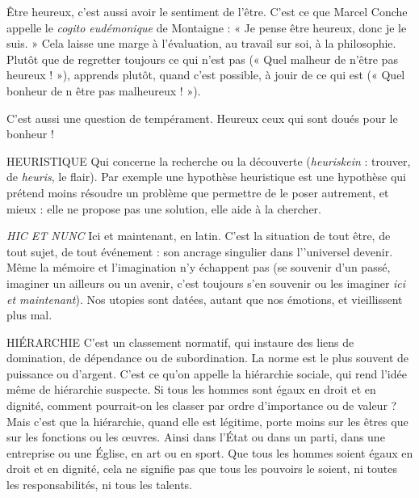Être heureux, c’est aussi avoir le sentiment de l’être. C’est ce que Marcel
Conche appelle le {\it cogito eudémonique} de Montaigne : « Je pense être heureux,
donc je le suis. » Cela laisse une marge à l’évaluation, au travail sur soi, à la philosophie.
Plutôt que de regretter toujours ce qui n’est pas (« Quel malheur de
n'être pas heureux ! »), apprends plutôt, quand c’est possible, à jouir de ce qui
est (« Quel bonheur de n être pas malheureux ! »).

C’est aussi une question de tempérament. Heureux ceux qui sont doués
pour le bonheur !

HEURISTIQUE Qui concerne la recherche ou la découverte ({\it heuriskein} :
trouver, de {\it heuris}, le flair). Par exemple une hypothèse
heuristique est une hypothèse qui prétend moins résoudre un problème que
permettre de le poser autrement, et mieux : elle ne propose pas une solution,
elle aide à la chercher.

{\it HIC ET NUNC} Ici et maintenant, en latin. C’est la situation de tout être, de
tout sujet, de tout événement : son ancrage singulier dans
l’'universel devenir. Même la mémoire et l'imagination n’y échappent pas (se
souvenir d’un passé, imaginer un ailleurs ou un avenir, c’est toujours s’en souvenir
ou les imaginer {\it ici et maintenant}). Nos utopies sont datées, autant que
nos émotions, et vieillissent plus mal.

HIÉRARCHIE C’est un classement normatif, qui instaure des liens de
domination, de dépendance ou de subordination. La norme
est le plus souvent de puissance ou d’argent. C’est ce qu’on appelle la hiérarchie
sociale, qui rend l’idée même de hiérarchie suspecte. Si tous les hommes sont
égaux en droit et en dignité, comment pourrait-on les classer par ordre
d'importance ou de valeur ? Mais c’est que la hiérarchie, quand elle est légitime,
porte moins sur les êtres que sur les fonctions ou les œuvres. Ainsi dans
l'État ou dans un parti, dans une entreprise ou une Église, en art ou en sport.
Que tous les hommes soient égaux en droit et en dignité, cela ne signifie pas
que tous les pouvoirs le soient, ni toutes les responsabilités, ni tous les talents.

